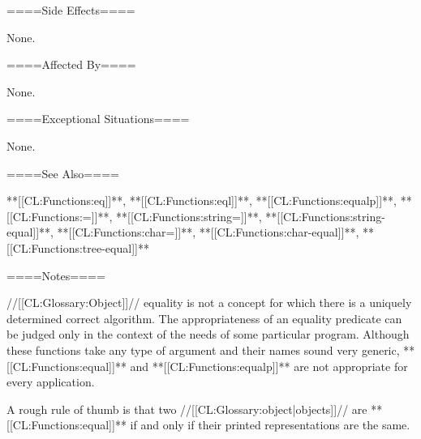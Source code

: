 ====Side Effects====

None.

====Affected By====

None.

====Exceptional Situations====

None.

====See Also====

**[[CL:Functions:eq]]**, **[[CL:Functions:eql]]**, **[[CL:Functions:equalp]]**, **[[CL:Functions:=]]**, **[[CL:Functions:string=]]**, **[[CL:Functions:string-equal]]**, **[[CL:Functions:char=]]**, **[[CL:Functions:char-equal]]**, **[[CL:Functions:tree-equal]]**

====Notes====

//[[CL:Glossary:Object]]// equality is not a concept for which there is a uniquely determined correct algorithm. The appropriateness of an equality predicate can be judged only in the context of the needs of some particular program. Although these functions take any type of argument and their names sound very generic, **[[CL:Functions:equal]]** and **[[CL:Functions:equalp]]** are not appropriate for every application.


A rough rule of thumb is that two //[[CL:Glossary:object|objects]]// are **[[CL:Functions:equal]]** if and only if their printed representations are the same.



  
